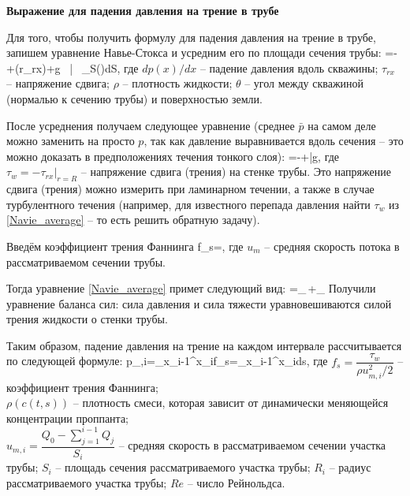 \textbf{Выражение для падения давления на трение в трубе}

Для того, чтобы получить формулу для падения давления на трение в трубе, запишем уравнение Навье-Стокса и усредним его по площади сечения трубы:
=-+\left(r\tau_{rx}\right)+\rho g \sin{\theta}\,\,\,\bigg|\,\,\,\,\,\int\limits_{S}\left(\cdot\right)dS,
\eeq
где $dp(x)/dx$ -- падение давления вдоль скважины;
$\tau_{rx}$ -- напряжение сдвига;
$\rho$ -- плотность жидкости;
$\theta$ -- угол между скважиной (нормалью к сечению трубы) и поверхностью земли.

После усреднения получаем следующее уравнение (среднее $\bar{p}$ на самом деле можно заменить на просто $p$, так как давление выравнивается вдоль сечения -- это можно доказать в предположениях течения тонкого слоя):
\beq\label{Navie_average}
=-+\bar{\rho}g\sin{\theta},
\eeq
где $\tau_w=-\tau_{rx}|_{r=R}$ -- напряжение сдвига (трения) на стенке трубы.
Это напряжение сдвига (трения) можно измерить при ламинарном течении, а также в случае турбулентного течения (например, для известного перепада давления найти $\tau_w$ из \eqref{Navie_average} -- то есть решить обратную задачу).

Введём коэффициент трения Фаннинга
\beq
f_s=,
\eeq
где $u_m$ -- средняя скорость потока в рассматриваемом сечении трубы.

Тогда уравнение \eqref{Navie_average} примет следующий вид:
\beq
{}=_{}\,+_{}
\eeq
Получили уравнение баланса сил: сила давления и сила тяжести уравновешиваются силой трения жидкости о стенки трубы.

Таким образом, падение давления на трение на каждом интервале рассчитывается по следующей формуле:
\beq\label{3_5}
\Delta p_{,i}=\int\limits_{x_{i-1}}^{x_i}{f_s}=\int\limits_{x_{i-1}}^{x_i}{}ds,
\eeq
где $f_s=\dfrac{\tau_w}{\rho u_{m,i}^2/2}$ -- коэффициент трения Фаннинга;\newline\\
$\rho(c(t,s))$ -- плотность смеси, которая зависит от динамически меняющейся концентрации проппанта;\newline\\
$u_{m,i}=\dfrac{Q_0-\sum\limits_{j=1}^{i-1}{Q_j}}{S_i}$ -- средняя скорость в рассматриваемом сечении участка трубы;\newline
$S_i$ -- площадь сечения рассматриваемого участка трубы;\newline
$R_i$ -- радиус рассматриваемого участка трубы;\newline
$Re$ -- число Рейнольдса.

